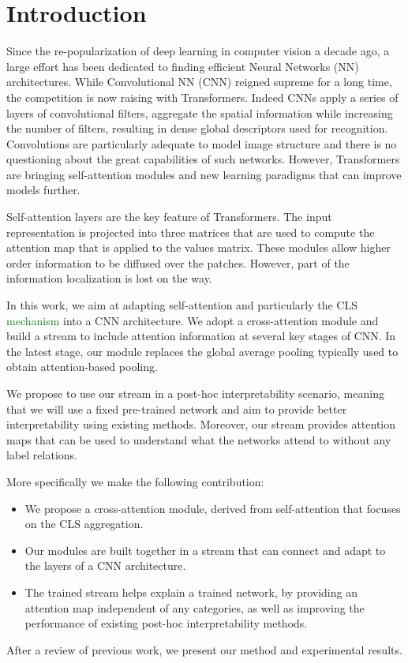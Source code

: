 \section{Introduction}





Since the re-popularization of deep learning in computer vision a decade ago, a large effort has been dedicated to finding efficient Neural Networks (NN) architectures.
While Convolutional NN (CNN) reigned supreme for a long time, the competition is now raising with Transformers.
Indeed CNNs apply a series of layers of convolutional filters, aggregate the spatial information while increasing the number of filters, resulting in dense global descriptors used for recognition.
Convolutions are particularly adequate to model image structure and there is no questioning about the great capabilities of such networks.
However, Transformers are bringing self-attention modules and new learning paradigms that can improve models further.

Self-attention layers are the key feature of Transformers. 
The input representation is projected into three matrices that are used to compute the attention map that is applied to the values matrix.
These modules allow higher order information to be diffused over the patches.
However, part of the information localization is lost on the way.

In this work, we aim at adapting self-attention and particularly the CLS \textcolor{green}{mechanism} into a CNN architecture.
We adopt a cross-attention module and build a stream to include attention information at several key stages of CNN. 
In the latest stage, our module replaces the global average pooling typically used to obtain attention-based pooling.

We propose to use our stream in a post-hoc interpretability scenario, meaning that we will use a fixed pre-trained network and aim to provide better interpretability using existing methods.
Moreover, our stream provides attention maps that can be used to understand what the networks attend to without any label relations.

More specifically we make the following contribution:
\begin{itemize}
    \item We propose a cross-attention module, derived from self-attention that focuses on the CLS aggregation.
    \item Our modules are built together in a stream that can connect and adapt to the layers of a CNN architecture.
    \item The trained stream helps explain a trained network, by providing an attention map independent of any categories, as well as improving the performance of existing post-hoc interpretability methods.
\end{itemize}

After a review of previous work, we present our method and experimental results.




